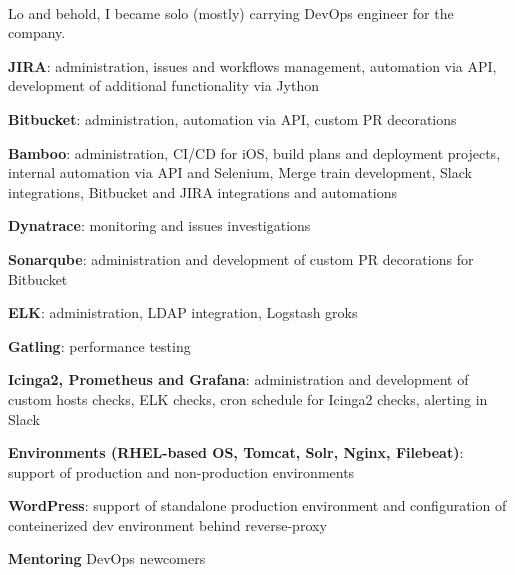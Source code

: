 \documentclass[a4paper]{MagicalCV}
\begin{document}
\begin{minipage}[t]{0.64\textwidth} 


 \\
\vspace{\topsep} %
Lo and behold, I became solo (mostly) carrying DevOps engineer for the company.
\begin{tightemize}
  \item \textbf{JIRA}: administration, issues and workflows management, automation via API,
    development of additional functionality via Jython
  \item \textbf{Bitbucket}: administration, automation via API, custom PR decorations
  \item \textbf{Bamboo}: administration, CI/CD for iOS, build plans and deployment projects,
    internal automation via API and Selenium, Merge train development, Slack integrations,
    Bitbucket and JIRA integrations and automations
  \item \textbf{Dynatrace}: monitoring and issues investigations
  \item \textbf{Sonarqube}: administration and development of custom PR decorations for Bitbucket
  \item \textbf{ELK}: administration, LDAP integration, Logstash groks
  \item \textbf{Gatling}: performance testing
  \item \textbf{Icinga2, Prometheus and Grafana}: administration and development of custom hosts checks,
    ELK checks, cron schedule for Icinga2 checks, alerting in Slack
  \item \textbf{Environments (RHEL-based OS, Tomcat, Solr, Nginx, Filebeat)}: support of production and
    non-production environments
  \item \textbf{WordPress}: support of standalone production environment and configuration of conteinerized
    dev environment behind reverse-proxy
  \item \textbf{Mentoring} DevOps newcomers
\end{tightemize}
\sectionsep


\end{minipage}
\end{document}
